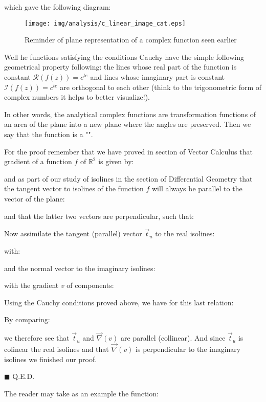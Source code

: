 	which gave the following diagram:
	\begin{figure}[H]
		\begin{center}
			\texttt{[image: img/analysis/c\_linear\_image\_cat.eps]}
		\end{center}	
		\caption{Reminder of plane representation of a complex function seen earlier}
	\end{figure}
	
	\begin{theorem}
	Well he functions satisfying the conditions Cauchy have the simple following geometrical property following: the lines whose real part of the function is constant $\mathcal{R}(f(z))=c^{te}$ and lines whose imaginary part is constant $\mathcal{I}(f(z))=c^{te}$  are orthogonal to each other (think to the trigonometric form of complex numbers it helps to better visualize!).
	
	In other words, the analytical complex functions are transformation functions of an area of the plane into a new plane where the angles are preserved. Then we say that the function is a "".
	\end{theorem}
	
	\begin{dem}
	For the proof remember that we have proved in section of Vector Calculus that  gradient of a function $f$ of $\mathbb{R}^2$ is given by:
	
	and as part of our study of isolines in the section of Differential Geometry that the tangent vector to isolines of the function $f$ will always be parallel to the vector of the plane:
	
	and that the latter two vectors are perpendicular, such that:
	
	Now assimilate the tangent (parallel) vector $\vec{t}_u$ to the real isolines:
	
	with:
	
	and the normal vector to the imaginary isolines:
	
	with the gradient $v$ of components:
	
	Using the Cauchy conditions proved above, we have for this last relation:
	
	By comparing:
	
	we therefore see that $\vec{t}_u$ and $\vec{\nabla}(v)$ are parallel (collinear). And since $\vec{t}_u$ is colinear the real isolines and that $\vec{\nabla}(v)$  is perpendicular to the imaginary isolines we finished our proof.
	\begin{flushright}
		$\blacksquare$  Q.E.D.
	\end{flushright}
	\end{dem}
	The reader may take as an example the function:
	
